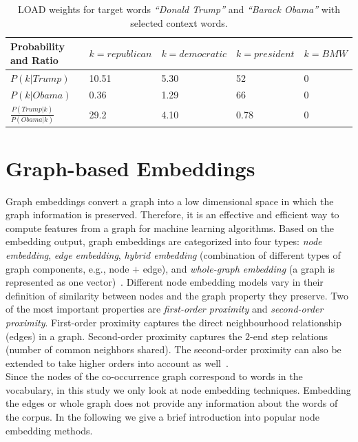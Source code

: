 \begin{table}[]
\centering

\begin{tabular}{@{}l|l|l|l|l@{}}
\toprule
Probability and Ratio&  $k=republican$& $k=democratic$ & $k=president$ &$k= BMW$  \\ \midrule
 $P(k|Trump)$& {\color[HTML]{CB0000}10.51} &  {\color[HTML]{329A9D}5.30} & {\color[HTML]{CB0000}52} & {\color[HTML]{329A9D}0} \\\midrule
  $P(k|Obama)$&{\color[HTML]{329A9D}0.36}  & {\color[HTML]{CB0000}1.29} &  {\color[HTML]{CB0000}66}&{\color[HTML]{329A9D}0}  \\\midrule
 $\frac { P(Trump|k) }{ P(Obama|k) } $& {\color[HTML]{CB0000}29.2} &  {\color[HTML]{329A9D}4.10}&  0.78 &    0  \\\midrule
\end{tabular}%

\caption{LOAD weights for target words \emph{``Donald Trump''} and \emph{``Barack Obama''} with selected context words. }
\label{table:tab_2}
\end{table}
\label{sec:components_load}
\section{Graph-based Embeddings}
\label{sec:graph}
Graph embeddings convert a graph into a low dimensional space in which the graph information is preserved. Therefore, it is an effective and efficient way to compute features from a graph for machine learning algorithms. Based on the embedding output, graph embeddings are categorized into four types: \emph{node embedding}, \emph{edge embedding}, \emph{hybrid embedding} (combination of different types of graph components, e.g., node $+$ edge), and  \emph{whole-graph embedding} (a graph is represented as one vector)~. Different node embedding models vary in their definition of similarity between nodes and the graph property they preserve. Two of the most important properties are \emph{first-order proximity} and \emph{second-order proximity}. First-order proximity captures the direct neighbourhood relationship (edges) in a graph. Second-order proximity captures the $2$-end step relations (number of common neighbors shared). The second-order proximity can also be extended to take higher orders into account as well~.\\
Since the nodes of the co-occurrence graph correspond to words in the vocabulary, in this study we only look at node embedding techniques. Embedding the edges or whole graph does not provide any information about the words of the corpus. In the following we give a brief introduction into popular node embedding methods. 
